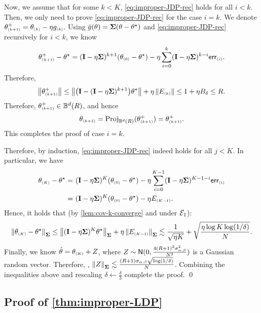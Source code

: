 Now, we assume that for some $k<K$, \eqref{eq:improper-JDP-rec} holds for all $i<k$. Then, we only need to prove \eqref{eq:improper-JDP-rec} for the case $i=k$. We denote $\theta\kp^+=\theta\kk-\eta g\kk$. Using $\og(\theta)=\bSigma (\theta-\ths)$ and \eqref{eq:improper-JDP-rec} recursively for $i<k$, we know
\begin{align*}
    \theta\kp^+-\ths=(\id-\eta\bSigma)^{k+1}(\theta\kz-\ths)-\eta \sum_{i=0}^{k} (\id-\eta\bSigma)^{k-i} \gerr{i}.
\end{align*}
Therefore,
\begin{align*}
    \nrm{\theta\kp^+}\leq \nrm{\paren{\id-(\id-\eta\bSigma)^{k+1}}\ths}+\eta \nrm{E\kk}\leq 1+\eta B_\delta\leq R.
\end{align*}
Therefore, $\theta\kp^+\in\BR$, and hence
\begin{align*}
    \theta\kp=\Proj_{\BR}(\theta\kp^+)=\theta\kp^+.
\end{align*}
This completes the proof of case $i=k$. 

Therefore, by induction, \eqref{eq:improper-JDP-rec} indeed holds for all $j<K$. In particular, we have
\begin{align*}
    \theta\kc-\ths=&~(\id-\eta\bSigma)^{K}(\theta\kz-\ths)-\eta \sum_{i=0}^{K-1} (\id-\eta\bSigma)^{K-1-i} \gerr{i} \\
    =&~ (\id-\eta\bSigma)^{K}(\theta\kz-\ths)-\eta E\epk{K-1}.
\end{align*}
Hence, it holds that (by \cref{lem:cov-k-converge} and under $\cE_1$):
\begin{align*}
    \nrm{\theta\kc-\ths}_{\bSigma}\leq \nrm{(\id-\eta\bSigma)^{K}\ths}_{\bSigma}+\eta\nrm{E\epk{K-1}}_{\bSigma}
    \leqsim \frac{1}{\sqrt{\eta K}}+\sqrt{\frac{\eta\log K\log(1/\delta)}{ N}}.
\end{align*}
Finally, we know $\hth=\theta\kc+Z$, where $Z\sim \normal{0,\frac{4(R+1)^2\siga^2}{N^2}}$ is a Gaussian random vector. Therefore, \whp, $\nrm{Z}_{\bSigma}\leqsim \frac{(R+1)\siga\sqrt{\log(1/\delta)}}{N}$. Combining the inequalities above and rescaling $\delta\leftarrow \frac{\delta}{3}$ complete the proof.
\qed

\subsection{Proof of \cref{thm:improper-LDP}}





\newcommand{\sigsp}{\sigma_{N}}



